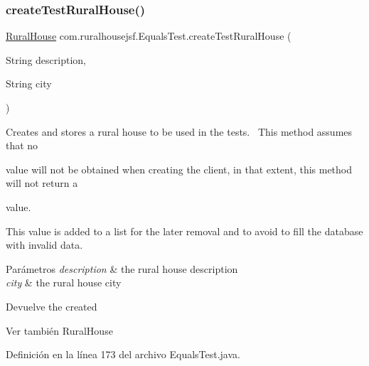 \subsubsection{\texorpdfstring{createTestRuralHouse()}{createTestRuralHouse()}}
{\footnotesize\ttfamily \mbox{\hyperlink{classcom_1_1ruralhousejsf_1_1domain_1_1_rural_house}{Rural\+House}} com.\+ruralhousejsf.\+Equals\+Test.\+create\+Test\+Rural\+House (\begin{DoxyParamCaption}\item[{String}]{description,  }\item[{String}]{city }\end{DoxyParamCaption})\hspace{0.3cm}{\ttfamily [private]}}

Creates and stores a rural house to be used in the tests.~\newline
 This method assumes that no
\begin{DoxyCode}{0}
\DoxyCodeLine{\textcolor{keyword}{null} }
\end{DoxyCode}
 value will not be obtained when creating the client, in that extent, this method will not return a 
\begin{DoxyCode}{0}
\DoxyCodeLine{\textcolor{keyword}{null} }
\end{DoxyCode}
 value. 

This value is added to a list for the later removal and to avoid to fill the database with invalid data.


\begin{DoxyParams}{Parámetros}
{\em description} & the rural house description \\
\hline
{\em city} & the rural house city\\
\hline
\end{DoxyParams}
\begin{DoxyReturn}{Devuelve}
the created
\begin{DoxyCode}{0}
\end{DoxyCode}

\end{DoxyReturn}
\begin{DoxySeeAlso}{Ver también}
Rural\+House 
\end{DoxySeeAlso}


Definición en la línea 173 del archivo Equals\+Test.\+java.

\mbox{\label{classcom_1_1ruralhousejsf_1_1_equals_test_a74a69f394f6e76a2f557132edbc2ea00}} 
